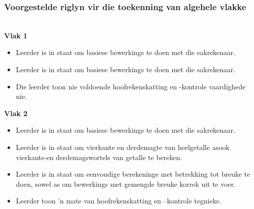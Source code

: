 \subsubsection{Voorgestelde riglyn vir die toekenning van algehele vlakke}\\
\textbf{Vlak 1}
\begin{itemize}[noitemsep]
\item
Leerder is in staat om basiese bewerkings te doen met die sakrekenaar.
\item
Leerder is in staat om basiese bewerkings te doen met die sakrekenaar.
\item
Die leerder toon nie voldoende hoofrekenskatting en -kontrole vaardighede nie.
\end{itemize}
\textbf{Vlak 2}\begin{itemize}[noitemsep]
\item
Leerder is in staat om basiese bewerkings te doen met die sakrekenaar.
\item
Leerder is in staat om vierkante en derdemagte van heelgetalle asook vierkants-en derdemagswortels van getalle te bereken.
\item
Leerder is in staat om eenvoudige berekeninge met betrekking tot breuke te doen, sowel as om bewerkings met gemengde breuke korrek uit te voer.
\item
Leerder toon 'n mate van hoofrekenskatting en –kontrole tegnieke.
\end{itemize}
